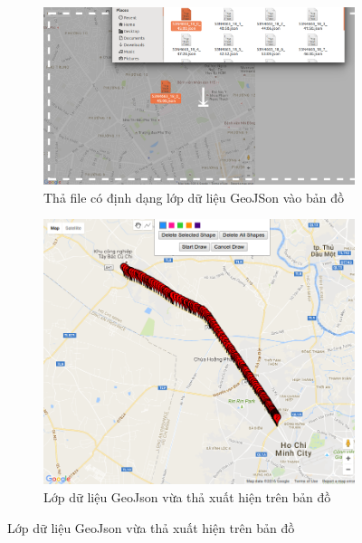 \documentclass[a4paper, 13pt]{report}
\begin{document}
\begin{enumerate}[label=\textbf{PL\arabic*}]
\begin{figure}[h]
\caption{Ứng dụng bản demo "Drag And Drop data layer GeoJSON"}
    \begin{subfigure}[b]{0.4\textwidth}
        \includegraphics[width=\textwidth]{dragAndDrop1.png}
        \caption{Thả file có định dạng lớp dữ liệu GeoJSon vào bản đồ}
    \end{subfigure}
    \begin{subfigure}[b]{0.4\textwidth}
        \includegraphics[width=\textwidth]{dragAndDrop2.png}
        \caption{Lớp dữ liệu GeoJson vừa thả xuất hiện trên bản đồ}
    \end{subfigure}
\end{figure}
\FloatBarrier


\end{enumerate}
\end{document}
